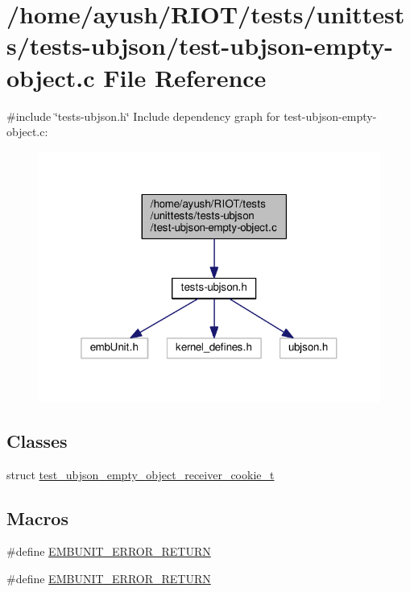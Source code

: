 \hypertarget{test-ubjson-empty-object_8c}{}\section{/home/ayush/\+R\+I\+O\+T/tests/unittests/tests-\/ubjson/test-\/ubjson-\/empty-\/object.c File Reference}
\label{test-ubjson-empty-object_8c}
{\ttfamily \#include \char`\"{}tests-\/ubjson.\+h\char`\"{}}\newline
Include dependency graph for test-\/ubjson-\/empty-\/object.c\+:
\nopagebreak
\begin{figure}[H]
\begin{center}
\leavevmode
\includegraphics[width=319pt]{test-ubjson-empty-object_8c__incl}
\end{center}
\end{figure}
\subsection*{Classes}
\begin{DoxyCompactItemize}
\item 
struct \hyperlink{structtest__ubjson__empty__object__receiver__cookie__t}{test\+\_\+ubjson\+\_\+empty\+\_\+object\+\_\+receiver\+\_\+cookie\+\_\+t}
\end{DoxyCompactItemize}
\subsection*{Macros}
\begin{DoxyCompactItemize}
\item 
\#define \hyperlink{test-ubjson-empty-object_8c_a3a0f560c4fe9cc5130773a84ff587b9e}{E\+M\+B\+U\+N\+I\+T\+\_\+\+E\+R\+R\+O\+R\+\_\+\+R\+E\+T\+U\+RN}
\item 
\#define \hyperlink{test-ubjson-empty-object_8c_a3a0f560c4fe9cc5130773a84ff587b9e}{E\+M\+B\+U\+N\+I\+T\+\_\+\+E\+R\+R\+O\+R\+\_\+\+R\+E\+T\+U\+RN}
\end{DoxyCompactItemize}
